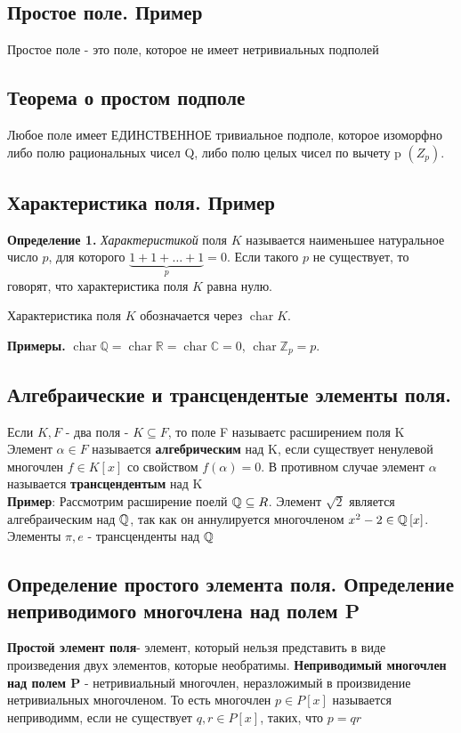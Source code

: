 \subsection{Простое поле. Пример}
Простое поле - это поле, которое не имеет нетривиальных подполей
\subsection{Теорема о простом подполе}
Любое поле имеет ЕДИНСТВЕННОЕ тривиальное подполе, которое изоморфно либо полю рациональных чисел Q, либо полю целых чисел по вычету p  $(Z_{p})$.
\subsection{Характеристика поля. Пример}
\textbf{Определение 1.} \textit{Характеристикой} поля $K$ называется наименьшее натуральное число $p$, для которого $\underbrace{1 + 1 + \ldots + 1}_{p} = 0$. Если такого $p$ не существует, то говорят, что характеристика поля $K$ равна нулю.

Характеристика поля $K$ обозначается через $\operatorname{char} K$.

\textbf{Примеры.} $\operatorname{char} \mathbb{Q} = \operatorname{char} \mathbb{R} = \operatorname{char} \mathbb{C} = 0$, $\operatorname{char} \mathbb{Z}_p = p$.
\subsection{Алгебраические и трансцендентые элементы поля.}
Если $K, F$ - два поля - $K\subseteq F$, то поле F называетс расширением поля K\\
Элемент $\alpha\in F$ называется \textbf{алгебрическим} над K, если существует ненулевой многочлен $f\in K \left[x\right] $ со свойством $f(\alpha)= 0$. В противном случае элемент $\alpha$ называется \textbf{трансцендентым} над K\\
\textbf{Пример}: Рассмотрим расширение поелй $\mathbb{Q}\subseteq R$. Элемент $\sqrt2$ является алгебраическим над $\mathbb{Q}$, так как он аннулируется многочленом $x^2-2\in\mathbb{Q} \left[x\right]$. Элементы $\pi, e$ - трансценденты над $\mathbb{Q}$
\subsection{Определение простого элемента поля. Определение неприводимого многочлена над полем P}
\textbf{Простой элемент поля}- элемент, который  нельзя представить в виде произведения двух элементов, которые необратимы.
\textbf{Неприводимый многочлен над полем P} - нетривиальный многочлен, неразложимый в произвидение нетривиальных многочленом. То есть многочлен $p\in P\left[x\right]$ называется неприводимм, если не существует $q,r\in P\left[x\right]$, таких, что $p=qr$
